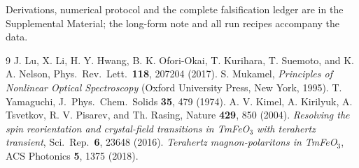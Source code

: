 \documentclass[aps,prb,twocolumn,superscriptaddress,longbibliography]{revtex4-2}
\begin{document}
\begin{acknowledgments}
Derivations, numerical protocol and the complete falsification ledger are
in the Supplemental Material; the long-form note and all run recipes
accompany the data.
\end{acknowledgments}

\begin{thebibliography}{9}
 J. Lu, X. Li, H. Y. Hwang, B. K. Ofori-Okai,
  T. Kurihara, T. Suemoto, and K. A. Nelson,
  Phys.\ Rev.\ Lett.\ \textbf{118}, 207204 (2017).
 S. Mukamel, \emph{Principles of Nonlinear Optical
  Spectroscopy} (Oxford University Press, New York, 1995).
 T. Yamaguchi,
  J.\ Phys.\ Chem.\ Solids \textbf{35}, 479 (1974).
 A. V. Kimel, A. Kirilyuk, A. Tsvetkov, R. V.
  Pisarev, and Th. Rasing, Nature \textbf{429}, 850 (2004).
 \emph{Resolving the spin reorientation and
  crystal-field transitions in TmFeO$_3$ with terahertz transient},
  Sci.\ Rep.\ \textbf{6}, 23648 (2016).
 \emph{Terahertz magnon-polaritons in TmFeO$_3$},
  ACS Photonics \textbf{5}, 1375 (2018).
\end{thebibliography}
\end{document}
